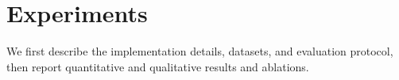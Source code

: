 \section{Experiments}
\label{sec:experiments}
We first describe the implementation details, datasets, and evaluation protocol, then report quantitative and qualitative results and ablations.


